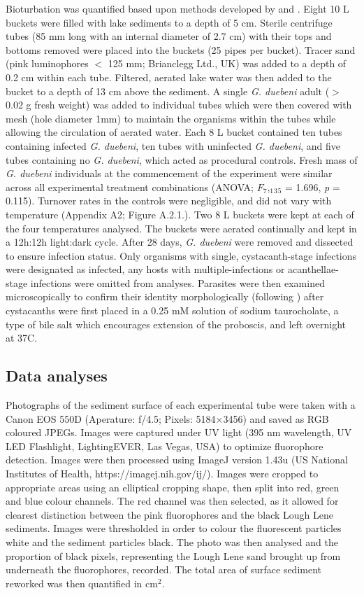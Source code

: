 Bioturbation was quantified based upon methods developed by \citet{denadai2013} and \citet{wohlgemuth2017}. Eight 10 L buckets were filled with lake sediments to a depth of 5 cm. Sterile centrifuge tubes (85 mm long with an internal diameter of 2.7 cm) with their tops and bottoms removed were placed into the buckets (25 pipes per bucket). Tracer sand (pink luminophores $<$ 125 mm; Brianclegg Ltd., UK) was added to a depth of 0.2 cm within each tube. Filtered, aerated lake water was then added to the bucket to a depth of 13 cm above the sediment. A single \emph{G. duebeni} adult ($>$ 0.02 g fresh weight) was added to individual tubes which were then covered with mesh (hole diameter 1mm) to maintain the organisms within the tubes while allowing the circulation of aerated water. Each 8 L bucket contained ten tubes containing infected \emph{G. duebeni}, ten tubes with uninfected \emph{G. duebeni}, and five tubes containing no \emph{G. duebeni}, which acted as procedural controls. Fresh mass of \emph{G. duebeni} individuals at the commencement of the experiment were similar across all experimental treatment combinations (ANOVA; $F_7$,$_1$$_3$$_5$ = 1.696,  \emph{p} = 0.115). Turnover rates in the controls were negligible, and did not vary with temperature (Appendix A2; Figure A.2.1.). Two 8 L buckets were kept at each of the four temperatures analysed. The buckets were aerated continually and kept in a 12h:12h light:dark cycle. After 28 days, \emph{G. duebeni} were removed and dissected to ensure infection status. Only organisms with single, cystacanth-stage infections were designated as infected, any hosts with multiple-infections or acanthellae-stage infections were omitted from analyses. Parasites were then examined microscopically to confirm their identity morphologically (following \citet{mcdonald1988}) after cystacanths were first placed in a 0.25 mM solution of sodium taurocholate, a type of bile salt which encourages extension of the proboscis, and left overnight at 37\degree C.

\subsection{Data analyses}

Photographs of the sediment surface of each experimental tube were taken with a Canon EOS 550D (Aperature: f/4.5; Pixels: 5184$\times$3456) and saved as RGB coloured JPEGs. Images were captured under UV light (395 nm wavelength, UV LED Flashlight, LightingEVER, Las Vegas, USA) to optimize fluorophore detection. Images were then processed using ImageJ version 1.43u (US National Institutes of Health, https://imagej.nih.gov/ij/). Images were cropped to appropriate areas using an elliptical cropping shape, then split into red, green and blue colour channels. The red channel was then selected, as it allowed for clearest distinction between the pink fluorophores and the black Lough Lene sediments.  Images were thresholded in order to colour the fluorescent particles white and the sediment particles black. The photo was then analysed and the proportion of black pixels, representing the Lough Lene sand brought up from underneath the fluorophores, recorded. The total area of surface sediment reworked was then quantified in cm$^2$. 

